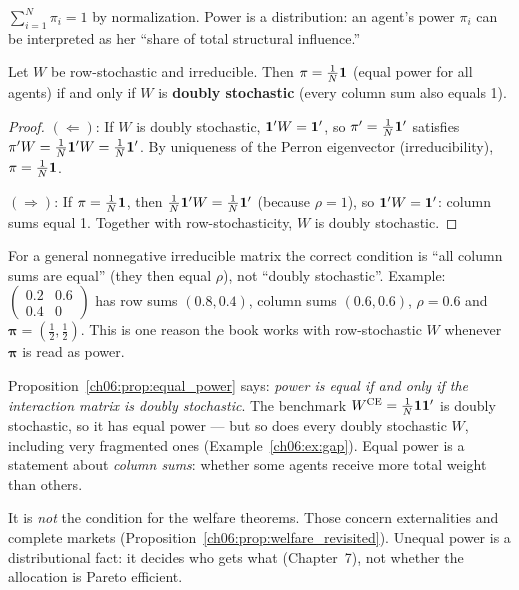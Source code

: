 \documentclass[../structural_economics_book.tex]{subfiles}
\begin{document}
\begin{remark}\label{ch06:prop:power_sum}
$\sum_{i=1}^N \pi_i = 1$ by normalization. Power is a distribution: an agent's power $\pi_i$ can be interpreted as her ``share of total structural influence.''
\end{remark}

\begin{proposition}\label{ch06:prop:equal_power}
Let $W$ be row-stochastic and irreducible. Then $\pi = \frac{1}{N}\mathbf{1}$ (equal power for all agents) if and only if $W$ is \textbf{doubly stochastic} (every column sum also equals 1).
\end{proposition}

\begin{proof}
$(\Leftarrow)$: If $W$ is doubly stochastic, $\mathbf{1}'W = \mathbf{1}'$, so $\pi' = \frac{1}{N}\mathbf{1}'$ satisfies $\pi'W = \frac{1}{N}\mathbf{1}'W = \frac{1}{N}\mathbf{1}'$. By uniqueness of the Perron eigenvector (irreducibility), $\pi = \frac{1}{N}\mathbf{1}$.

$(\Rightarrow)$: If $\pi = \frac{1}{N}\mathbf{1}$, then $\frac{1}{N}\mathbf{1}'W = \frac{1}{N}\mathbf{1}'$ (because $\rho = 1$), so $\mathbf{1}'W = \mathbf{1}'$: column sums equal 1. Together with row-stochasticity, $W$ is doubly stochastic.
\end{proof}

\begin{remark}
For a general nonnegative irreducible matrix the correct condition is ``all column sums are equal'' (they then equal $\rho$), not ``doubly stochastic''. Example: $\begin{pmatrix} 0.2 & 0.6 \\ 0.4 & 0 \end{pmatrix}$ has row sums $(0.8, 0.4)$, column sums $(0.6, 0.6)$, $\rho = 0.6$ and $\boldsymbol{\pi} = (\tfrac12, \tfrac12)$. This is one reason the book works with row-stochastic $W$ whenever $\boldsymbol{\pi}$ is read as power.
\end{remark}

\begin{intuition}
Proposition~\ref{ch06:prop:equal_power} says: \textit{power is equal if and only if the interaction matrix is doubly stochastic}. The benchmark $W^{\text{CE}} = \frac{1}{N}\mathbf{1}\mathbf{1}'$ is doubly stochastic, so it has equal power --- but so does every doubly stochastic $W$, including very fragmented ones (Example~\ref{ch06:ex:gap}). Equal power is a statement about \textit{column sums}: whether some agents receive more total weight than others.

It is \textit{not} the condition for the welfare theorems. Those concern externalities and complete markets (Proposition~\ref{ch06:prop:welfare_revisited}). Unequal power is a distributional fact: it decides who gets what (Chapter~7), not whether the allocation is Pareto efficient.
\end{intuition}
\end{document}
